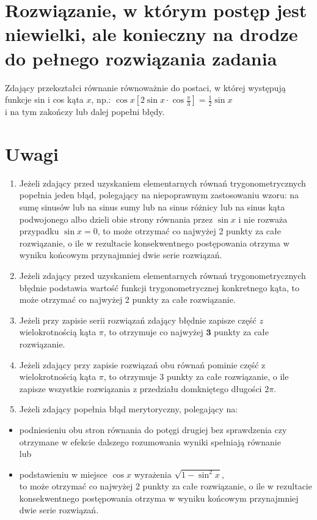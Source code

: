 \documentclass[10pt]{article}
\begin{document}
\section*{Rozwiązanie, w którym postęp jest niewielki, ale konieczny na drodze do pełnego rozwiązania zadania}
Zdający przekształci równanie równoważnie do postaci, w której występują funkcje sin i cos kąta $x$, np.: $\cos x\left[2 \sin x \cdot \cos \frac{\pi}{3}\right]=\frac{1}{2} \sin x$\\
i na tym zakończy lub dalej popełni błędy.

\section*{Uwagi}
\begin{enumerate}
  \item Jeżeli zdający przed uzyskaniem elementarnych równań trygonometrycznych popełnia jeden błąd, polegający na niepoprawnym zastosowaniu wzoru: na sumę sinusów lub na sinus sumy lub na sinus różnicy lub na sinus kąta podwojonego albo dzieli obie strony równania przez $\sin x$ i nie rozważa przypadku $\sin x=0$, to może otrzymać co najwyżej 2 punkty za całe rozwiązanie, o ile w rezultacie konsekwentnego postępowania otrzyma w wyniku końcowym przynajmniej dwie serie rozwiązań.
  \item Jeżeli zdający przed uzyskaniem elementarnych równań trygonometrycznych błędnie podstawia wartość funkcji trygonometrycznej konkretnego kąta, to może otrzymać co najwyżej 2 punkty za całe rozwiązanie.
  \item Jeżeli przy zapisie serii rozwiązań zdający błędnie zapisze część $z$ wielokrotnością kąta $\pi$, to otrzymuje co najwyżej $\mathbf{3}$ punkty za całe rozwiązanie.
  \item Jeżeli zdający przy zapisie rozwiązań obu równań pominie część z wielokrotnością kąta $\pi$, to otrzymuje 3 punkty za całe rozwiązanie, o ile zapisze wszystkie rozwiązania z przedziału domkniętego długości $2 \pi$.
  \item Jeżeli zdający popełnia błąd merytoryczny, polegający na:
\end{enumerate}

\begin{itemize}
  \item podniesieniu obu stron równania do potęgi drugiej bez sprawdzenia czy otrzymane w efekcie dalszego rozumowania wyniki spełniają równanie\\
lub
  \item podstawieniu w miejsce $\cos x$ wyrażenia $\sqrt{1-\sin ^{2} x}$,\\
to może otrzymać co najwyżej 2 punkty za całe rozwiązanie, o ile w rezultacie konsekwentnego postępowania otrzyma w wyniku końcowym przynajmniej dwie serie rozwiązań.
\end{itemize}
\end{document}
